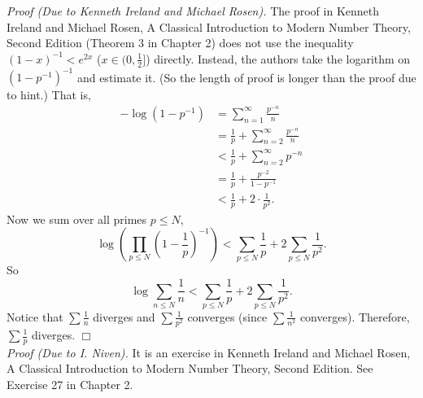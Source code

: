 \documentclass{article}
\begin{document}
\emph{Proof (Due to Kenneth Ireland and Michael Rosen).}
The proof in Kenneth Ireland and Michael Rosen,
A Classical Introduction to Modern Number Theory, Second Edition (Theorem 3 in Chapter 2)
does not use the inequality $(1 - x)^{-1} < e^{2x}$ ($x \in (0, \frac{1}{2}]$) directly.
Instead, the authors take the logarithm on $(1 - p^{-1})^{-1}$ and estimate it.
(So the length of proof is longer than the proof due to hint.)
That is,
\begin{align*}
- \log(1 - p^{-1})
&= \sum_{n = 1}^{\infty} \frac{p^{-n}}{n} \\
&= \frac{1}{p} + \sum_{n = 2}^{\infty} \frac{p^{-n}}{n} \\
&< \frac{1}{p} + \sum_{n = 2}^{\infty} p^{-n} \\
&= \frac{1}{p} + \frac{p^{-2}}{1 - p^{-1}} \\
&< \frac{1}{p} + 2 \cdot \frac{1}{p^2}.
\end{align*}
Now we sum over all primes $p \leq N$,
$$\log \left( \prod_{p \leq N} \left( 1 - \frac{1}{p} \right)^{-1} \right)
< \sum_{p \leq N} \frac{1}{p} + 2 \sum_{p \leq N} \frac{1}{p^2}.$$
So
$$\log \sum_{n \leq N} \frac{1}{n}
< \sum_{p \leq N} \frac{1}{p} + 2 \sum_{p \leq N} \frac{1}{p^2}.$$
Notice that $\sum \frac{1}{n}$ diverges and $\sum \frac{1}{p^2}$ converges
(since $\sum \frac{1}{n^2}$ converges).
Therefore, $\sum \frac{1}{p}$ diverges.
$\Box$ \\



\emph{Proof (Due to I. Niven).}
It is an exercise in Kenneth Ireland and Michael Rosen,
A Classical Introduction to Modern Number Theory, Second Edition. See Exercise 27 in Chapter 2.
\end{document}
